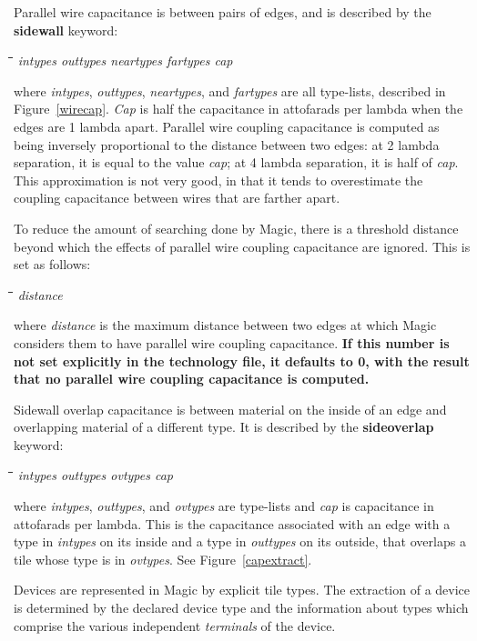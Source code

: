 \documentclass[letterpaper,twoside,12pt]{article}
\def\hinch{\hspace*{0.5in}}
\def\starti{\begin{center}\begin{tabbing}\hinch\=\hinch\=\hinch\=\hinch\=\kill}
\def\endi{\end{tabbing}\end{center}}
\def\ii{\>\>\>}
\begin{document}
Parallel wire capacitance is between pairs of edges, and
is described by the {\bfseries sidewall} keyword:

\starti
   \ii {\bfseries sidewall} {\itshape intypes outtypes neartypes fartypes cap}
\endi

where {\itshape intypes}, {\itshape outtypes}, {\itshape neartypes},
and {\itshape fartypes} are all type-lists, described in
Figure~\ref{wirecap}.  {\itshape Cap} is half the capacitance
in attofarads per lambda when the edges are 1 lambda apart.
Parallel wire coupling capacitance is computed as being
inversely proportional to the
distance between two edges: at 2 lambda separation, it is equal
to the value {\itshape cap}; at 4 lambda separation, it is half of {\itshape cap}.
This approximation is not very good, in that it tends to overestimate
the coupling capacitance between wires that are farther apart.

To reduce the amount of searching done by Magic, there is a
threshold distance beyond which the effects of parallel wire
coupling capacitance are ignored.
This is set as follows:

\starti
   \ii {\bfseries sidehalo} {\itshape distance}
\endi

where {\itshape distance} is the maximum distance between two edges
at which Magic considers them to have parallel wire coupling capacitance.
{\bfseries If this number is not set explicitly in the technology file,
it defaults to 0, with the result that no parallel wire
coupling capacitance is computed.}

Sidewall overlap capacitance is between material on the inside
of an edge and overlapping material of a different type.
It is described by the {\bfseries sideoverlap} keyword:

\starti
   \ii {\bfseries sideoverlap} {\itshape intypes outtypes ovtypes cap}
\endi

where {\itshape intypes}, {\itshape outtypes}, and {\itshape ovtypes} are type-lists
and {\itshape cap} is capacitance in attofarads per lambda.
This is the capacitance associated with an edge with a type
in {\itshape intypes} on its inside and a type in {\itshape outtypes} on
its outside, that overlaps a tile whose type is in {\itshape ovtypes}.
See Figure~\ref{capextract}.

Devices are represented in Magic by explicit tile types.
The extraction of a device is determined by the declared device type
and the information about types which comprise the various
independent {\itshape terminals} of the device.
\end{document}
